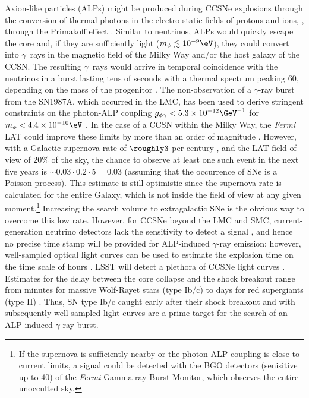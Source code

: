 Axion-like particles (ALPs) might be produced during CCSNe explosions through the conversion of thermal photons in the electro-static fields of protons and ions, \ie, through the Primakoff effect \citep{1996slfp.book.....R}.  
Similar to neutrinos, ALPs would quickly escape the core and, if they are sufficiently light ($m_\phi \lesssim 10^{-9} \eV$), they could convert into $\gamma$~rays in the magnetic field of the Milky Way and/or the host galaxy of the CCSN. 
The resulting $\gamma$~rays would arrive in temporal coincidence with the neutrinos in a burst lasting tens of seconds with a 
thermal spectrum peaking 60\MeV, depending on the mass of the progenitor \citep{2015JCAP...02..006P}.
The non-observation of a $\gamma$-ray burst from the SN1987A, which occurred in the LMC, has been used to derive stringent constraints on the photon-ALP coupling $g_{\phi\gamma}<5.3\times10^{-12}\GeV^{-1}$ for $m_\phi < 4.4\times10^{-10}\eV$ \citep{1996PhLB..383..439B, 1996PhRvL..77.2372G,2015JCAP...02..006P}.
In the case of a CCSN within the Milky Way, the \textit{Fermi} LAT could improve these limits by more than an order of magnitude \citep{2017PhRvL.118a1103M}. 
However, with a Galactic supernova rate of $\roughly 3$ per century \citep[\eg,][]{2013ApJ...778..164A}, and the LAT field of view of 20\% of the sky, the chance to observe at least one such event in the next five years is $\sim 0.03 \cdot 0.2 \cdot 5 = 0.03$ (assuming that the occurrence of SNe is a Poisson process). This estimate is still optimistic since the supernova rate is calculated for the entire Galaxy, which is not inside the field of view at any given moment.\footnote{If the supernova is sufficiently nearby or the photon-ALP coupling is close to current limits, a signal could be detected with the BGO detectors (senisitive up to 40\MeV) of the \emph{Fermi} Gamma-ray Burst Monitor, which observes the entire unocculted sky.}
Increasing the search volume to extragalactic SNe is the obvious way to overcome this low rate. 
However, for CCSNe beyond the LMC and SMC, current-generation neutrino detectors lack the sensitivity to detect a signal \citep[\eg,][]{2011PhRvD..83l3008K}, and hence no precise time stamp will be provided for ALP-induced $\gamma$-ray emission; however, well-sampled optical light curves can be used to estimate the explosion time on the time scale of hours \citep{2010APh....33...19C}. 
LSST will detect a plethora of CCSNe light curves \citep{Lien:2009}. 
Estimates for the delay between the core collapse and the shock breakout range from minutes for massive Wolf-Rayet stars (type Ib/c) to days for red supergiants (type II) \citep{2013ApJ...778...81K}. 
Thus, SN type Ib/c caught early after their shock breakout and with subsequently well-sampled light curves are a prime target for the search of an ALP-induced $\gamma$-ray burst. 

